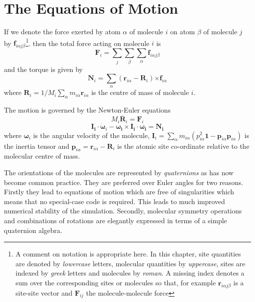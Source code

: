 \section{The Equations of Motion}  %
If we denote the force exerted by atom $\alpha$ of molecule $i$ on
atom $\beta$ of molecule $j$ by $\bm{f}_{i\alpha j\beta}$\footnote{A
comment on notation is appropriate here.  In this chapter, site
quantities are denoted by {\em lowercase\/} letters, molecular
quantities by {\em uppercase}, sites are indexed by {\em greek\/}
letters and molecules by {\em roman}. A missing index denotes a sum
over the corresponding sites or molecules so that, for example
$\bm{r}_{i\alpha j\beta}$ is a site-site vector and $\bm{F}_{ij}$ the
molecule-molecule force}.  then the total force acting on molecule $i$
is
\begin{equation}
\label{eqn:comf}
\bm{F}_i = \sum_j \sum_\beta \sum_\alpha \bm{f}_{i\alpha j\beta}
\end{equation}
and the torque is given by
\begin{equation}
\label{eqn:comt}
\bm{N}_i = \sum_\alpha (\bm{r}_{i \alpha} - \bm{R}_{i}) 
\bm{\times f}_{i\alpha} 
\end{equation}
where $\bm{R}_{i} = 1/M_i \sum_\alpha
m_{i\alpha} \bm{r}_{i\alpha}$ is the centre of mass of molecule $i$.

The motion is governed by the Newton-Euler equations
\begin{equation}
M_i\ddot{\bm{R}_i} = \bm{F}_i \label{eqn:newton}
\end{equation}
\begin{equation}
\bm{I_i \cdot} \dot{\bm{\omega}}_i - \bm{\omega_i \times I_i \cdot
\omega_i} = \bm{N_i} \label{eqn:euler}
\end{equation}
where  $\bm{\omega}_i$ is the angular velocity of the molecule, 
$ \bm{I}_i = \sum_{\alpha} m_{i\alpha} 
( p_{i\alpha}^2 \bm{1} - \bm{p}_{i\alpha}\bm{p}_{i\alpha} ) $ 
is the inertia tensor and 
$\bm{p}_{i\alpha} = \bm{r}_{i\alpha} - \bm{R}_i $
is the atomic site co-ordinate relative to the molecular centre of mass.

\label{sec:quaternions}
The orientations of the molecules are represented by {\em quaternions\/}
as  has now  become common  practice.   They are  preferred over Euler
angles for two reasons. Firstly they lead to equations of motion which
are  free  of singularities\cite{evans:77} which   means  that   no
special-case  code is required. This  leads to much improved numerical
stability      of  the  simulation\cite{evans:77b}.   Secondly,
molecular symmetry   operations   and  combinations of  rotations  are
elegantly expressed   in    terms  of     a     simple      quaternion
algebra\cite{evans:77b,pawley:85b}.

